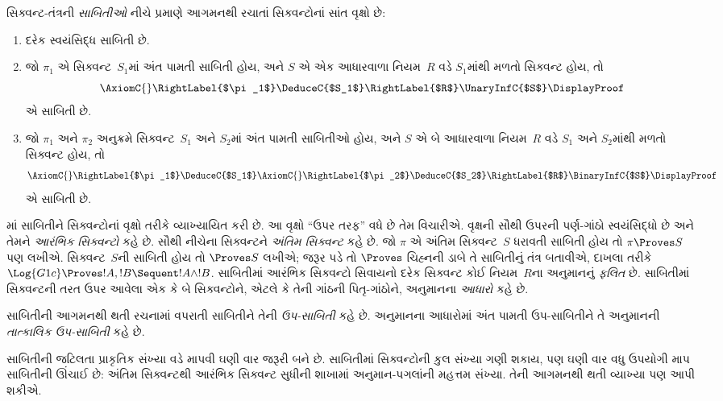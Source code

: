 \begin{defn}
સિક્વન્ટ-તંત્રની \emph{સાબિતીઓ} નીચે પ્રમાણે
આગમનથી રચાતાં સિક્વન્ટોનાં સાંત વૃક્ષો છે:
\begin{enumerate}
  \item{} દરેક સ્વયંસિદ્ધ સાબિતી છે.
  \item{} જો $\pi_1$ એ
  સિક્વન્ટ~$S_1$માં અંત પામતી સાબિતી હોય, અને $S$ એ
  એક આધારવાળા નિયમ~$R$ વડે $S_1$માંથી મળતો સિક્વન્ટ હોય, તો
  \[
  \AxiomC{}
  \RightLabel{$\pi_1$}
  \DeduceC{$S_1$}
  \RightLabel{$R$}
  \UnaryInfC{$S$}
  \DisplayProof
  \]
  એ સાબિતી છે.
  \item{} જો $\pi_1$ અને $\pi_2$
  અનુક્રમે સિક્વન્ટ~$S_1$ અને $S_2$માં અંત પામતી સાબિતીઓ
  હોય, અને $S$ એ બે આધારવાળા નિયમ~$R$ વડે $S_1$ અને $S_2$માંથી
  મળતો સિક્વન્ટ હોય, તો
  \[
  \AxiomC{}
  \RightLabel{$\pi_1$}
  \DeduceC{$S_1$}
  \AxiomC{}
  \RightLabel{$\pi_2$}
  \DeduceC{$S_2$}
  \RightLabel{$R$}
  \BinaryInfC{$S$}
  \DisplayProof
  \]
  એ સાબિતી છે.
\end{enumerate}
\end{defn}

માં સાબિતીને સિક્વન્ટોનાં વૃક્ષો
તરીકે વ્યાખ્યાયિત કરી છે. આ વૃક્ષો ``ઉપર તરફ''
વધે છે તેમ વિચારીએ. વૃક્ષની સૌથી ઉપરની પર્ણ-ગાંઠો
સ્વયંસિદ્ધો છે અને તેમને \emph{આરંભિક સિક્વન્ટો} કહે છે.
સૌથી નીચેના સિક્વન્ટને \emph{અંતિમ સિક્વન્ટ} કહે છે.
જો $\pi$ એ અંતિમ સિક્વન્ટ~$S$ ધરાવતી સાબિતી હોય તો
$\pi \Proves S$ પણ લખીએ. સિક્વન્ટ~$S$ની સાબિતી
હોય તો $\Proves S$ લખીએ; જરૂર પડે તો $\Proves$ ચિહ્નની
ડાબે તે સાબિતીનું તંત્ર બતાવીએ, દાખલા તરીકે
$\Log{G1c} \Proves !A, !B \Sequent !A \land
!B$. સાબિતીમાં આરંભિક સિક્વન્ટો સિવાયનો દરેક સિક્વન્ટ
કોઈ નિયમ~$R$ના અનુમાનનું \emph{ફલિત} છે.
સાબિતીમાં સિક્વન્ટની તરત ઉપર આવેલા એક કે બે સિક્વન્ટોને,
એટલે કે તેની ગાંઠની પિતૃ-ગાંઠોને, અનુમાનના \emph{આધારો} કહે છે.

સાબિતીની આગમનથી થતી રચનામાં વપરાતી
સાબિતીને તેની \emph{ઉપ-સાબિતી} કહે છે.
અનુમાનના આધારોમાં અંત પામતી ઉપ-સાબિતીને
તે અનુમાનની \emph{તાત્કાલિક ઉપ-સાબિતી} કહે છે.

સાબિતીની જટિલતા પ્રાકૃતિક સંખ્યા વડે માપવી ઘણી વાર
જરૂરી બને છે. સાબિતીમાં સિક્વન્ટોની કુલ સંખ્યા ગણી શકાય,
પણ ઘણી વાર વધુ ઉપયોગી માપ સાબિતીની ઊંચાઈ છે:
અંતિમ સિક્વન્ટથી આરંભિક સિક્વન્ટ સુધીની શાખામાં અનુમાન-પગલાંની
મહત્તમ સંખ્યા. તેની આગમનથી થતી વ્યાખ્યા પણ આપી શકીએ.

